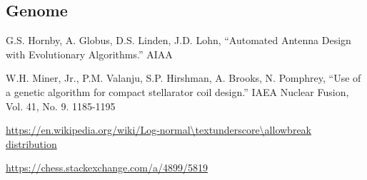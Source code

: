 \documentclass[letterpaper]{article}
\renewcommand\_{\textunderscore\allowbreak}
\begin{document}
\subsection{Genome}



\begin{thebibliography}{9}

G.S. Hornby, A. Globus, D.S. Linden, J.D. Lohn, ``Automated Antenna Design with Evolutionary Algorithms.'' AIAA

W.H. Miner, Jr., P.M. Valanju, S.P. Hirshman, A. Brooks, N. Pomphrey, ``Use of a genetic algorithm for compact stellarator coil design.'' IAEA Nuclear Fusion, Vol. 41, No. 9. 1185-1195

\url{https://en.wikipedia.org/wiki/Log-normal\_distribution}

\url{https://chess.stackexchange.com/a/4899/5819}

\end{thebibliography}
\end{document}
